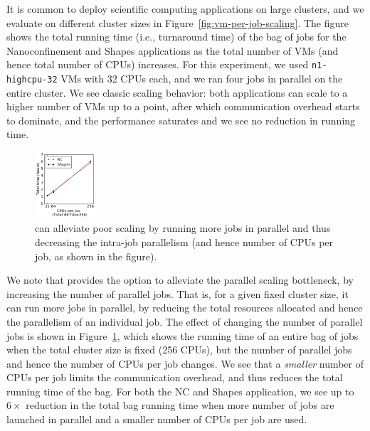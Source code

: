 It is common to deploy scientific computing applications on large clusters, and we evaluate \sysname on different cluster sizes in Figure~\ref{fig:vm-per-job-scaling}.
The figure shows the total running time (i.e., turnaround time) of the bag of jobs for the Nanoconfinement and Shapes applications as the total number of VMs (and hence total number of CPUs) increases.
For this experiment, we used \texttt{n1-highcpu-32} VMs with 32 CPUs each, and we ran four jobs in parallel on the entire cluster. 
We see classic scaling behavior: both applications can scale to a higher number of VMs up to a point, after which communication overhead starts to dominate, and the performance saturates and we see no reduction in running time. 


\begin{figure}
  \includegraphics[width=0.2\textwidth]{../graphs/par-scaling.pdf}
      \vspace*{\myfigspace}
  \caption{\sysname can alleviate poor scaling by running more jobs in parallel and thus decreasing the intra-job parallelism (and hence number of CPUs per job, as shown in the figure).}
  \label{fig:par-scaling}
    \vspace*{\myfigspace}
\end{figure}


We note that \sysname provides the option to alleviate the parallel scaling bottleneck, by increasing the number of parallel jobs.
That is, for a given fixed cluster size, it can run more jobs in parallel, by reducing the total resources allocated and hence the parallelism 
of an individual job. 
The effect of changing the number of parallel jobs is shown in Figure~\ref{fig:par-scaling}, which shows the running time of an entire bag of jobs when the total cluster size is fixed (256 CPUs), but the number of parallel jobs and hence the number of CPUs per job changes.
We see that a \emph{smaller} number of CPUs per job limits the communication overhead, and thus reduces the total running time of the bag.
For both the NC and Shapes application, we see up to $6\times$ reduction in the total bag running time when more number of jobs are launched in parallel and a smaller number of CPUs per job are used. 


